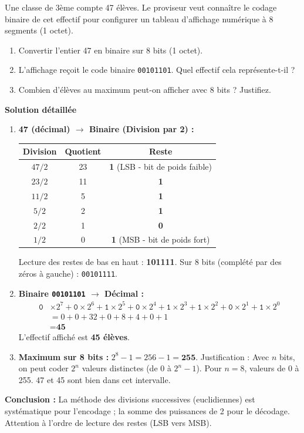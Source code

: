 \documentclass[11pt]{article}
\begin{document}
\begin{exoresolu}
    Une classe de 3ème compte 47 élèves. Le proviseur veut connaître le codage binaire de cet effectif pour configurer un tableau d'affichage numérique à 8 segments (1 octet).
    \begin{enumerate}
        \item Convertir l'entier 47 en binaire sur 8 bits (1 octet).
        \item L'affichage reçoit le code binaire \texttt{00101101}. Quel effectif cela représente-t-il ?
        \item Combien d'élèves au maximum peut-on afficher avec 8 bits ? Justifiez.
    \end{enumerate}
    \tcblower
    \textbf{Solution détaillée}
    \begin{enumerate}
        \item \textbf{47 (décimal) $\to$ Binaire (Division par 2) :}
        \begin{center}
        \begin{tabular}{c|c|c}
        \hline
        \textbf{Division} & \textbf{Quotient} & \textbf{Reste} \\ \hline
        $47 / 2$ & 23 & \textbf{1} (LSB - bit de poids faible) \\
        $23 / 2$ & 11 & \textbf{1} \\
        $11 / 2$ & 5  & \textbf{1} \\
        $5 / 2$  & 2  & \textbf{1} \\
        $2 / 2$  & 1  & \textbf{0} \\
        $1 / 2$  & 0  & \textbf{1} (MSB - bit de poids fort) \\ \hline
        \end{tabular}
        \end{center}
        Lecture des restes de bas en haut : \textbf{101111}.
        Sur 8 bits (complété par des zéros à gauche) : \texttt{00101111}.
        \item \textbf{Binaire \texttt{00101101} $\to$ Décimal :}
        \begin{align*}
        \texttt{0}&\times2^7 + \texttt{0}\times2^6 + \texttt{1}\times2^5 + \texttt{0}\times2^4 + \texttt{1}\times2^3 + \texttt{1}\times2^2 + \texttt{0}\times2^1 + \texttt{1}\times2^0 \\
        &= 0 + 0 + 32 + 0 + 8 + 4 + 0 + 1 \\
        &= \textbf{45}
        \end{align*}
        L'effectif affiché est \textbf{45 élèves}.
        \item \textbf{Maximum sur 8 bits :} $2^8 - 1 = 256 - 1 = \textbf{255}$.
        Justification : Avec $n$ bits, on peut coder $2^n$ valeurs distinctes (de 0 à $2^n-1$). Pour $n=8$, valeurs de 0 à 255. 47 et 45 sont bien dans cet intervalle.
    \end{enumerate}
    \textbf{Conclusion :} La méthode des divisions successives (euclidiennes) est systématique pour l'encodage ; la somme des puissances de 2 pour le décodage. Attention à l'ordre de lecture des restes (LSB vers MSB).
\end{exoresolu}
\end{document}
